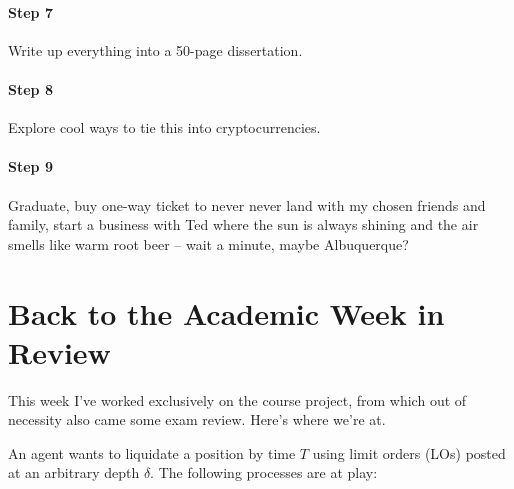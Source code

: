\documentclass[12pt]{article}
\begin{document}
\paragraph{Step 7} Write up everything into a 50-page dissertation.
\paragraph{Step 8} Explore cool ways to tie this into cryptocurrencies.
\paragraph{Step 9} Graduate, buy one-way ticket to never never land with my chosen friends and family, start a business with Ted where the sun is always shining and the air smells like warm root beer -- wait a minute, maybe Albuquerque?

\section*{Back to the Academic Week in Review}
This week I've worked exclusively on the course project, from which out of necessity also came some exam review. Here's where we're at.

An agent wants to liquidate a position by time $T$ using limit orders (LOs) posted at an arbitrary depth $\delta$. The following processes are at play:
\end{document}
